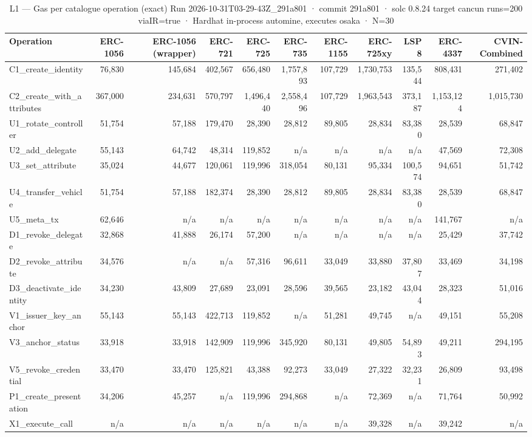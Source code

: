 \begin{table}[ht]
\centering
\small
\begin{tabular}{lrrrrrrrrrr}
\toprule
Operation & ERC-1056 & ERC-1056 (wrapper) & ERC-721 & ERC-725 & ERC-735 & ERC-1155 & ERC-725xy & LSP8 & ERC-4337 & CVIN-Combined \\
\midrule
C1\_create\_identity & 76,830 & 145,684 & 402,567 & 656,480 & 1,757,893 & 107,729 & 1,730,753 & 135,544 & 808,431 & 271,402 \\
C2\_create\_with\_attributes & 367,000 & 234,631 & 570,797 & 1,496,440 & 2,558,496 & 107,729 & 1,963,543 & 373,187 & 1,153,124 & 1,015,730 \\
U1\_rotate\_controller & 51,754 & 57,188 & 179,470 & 28,390 & 28,812 & 89,805 & 28,834 & 83,380 & 28,539 & 68,847 \\
U2\_add\_delegate & 55,143 & 64,742 & 48,314 & 119,852 & n/a & n/a & n/a & n/a & 47,569 & 72,308 \\
U3\_set\_attribute & 35,024 & 44,677 & 120,061 & 119,996 & 318,054 & 80,131 & 95,334 & 100,574 & 94,651 & 51,742 \\
U4\_transfer\_vehicle & 51,754 & 57,188 & 182,374 & 28,390 & 28,812 & 89,805 & 28,834 & 83,380 & 28,539 & 68,847 \\
U5\_meta\_tx & 62,646 & n/a & n/a & n/a & n/a & n/a & n/a & n/a & 141,767 & n/a \\
D1\_revoke\_delegate & 32,868 & 41,888 & 26,174 & 57,200 & n/a & n/a & n/a & n/a & 25,429 & 37,742 \\
D2\_revoke\_attribute & 34,576 & n/a & n/a & 57,316 & 96,611 & 33,049 & 33,880 & 37,807 & 33,469 & 34,198 \\
D3\_deactivate\_identity & 34,230 & 43,809 & 27,689 & 23,091 & 28,596 & 39,565 & 23,182 & 43,044 & 28,323 & 51,016 \\
V1\_issuer\_key\_anchor & 55,143 & 55,143 & 422,713 & 119,852 & n/a & 51,281 & 49,745 & n/a & 49,151 & 55,208 \\
V3\_anchor\_status & 33,918 & 33,918 & 142,909 & 119,996 & 345,920 & 80,131 & 49,805 & 54,893 & 49,211 & 294,195 \\
V5\_revoke\_credential & 33,470 & 33,470 & 125,821 & 43,388 & 92,273 & 33,049 & 27,322 & 32,231 & 26,809 & 93,498 \\
P1\_create\_presentation & 34,206 & 45,257 & n/a & 119,996 & 294,868 & n/a & 72,369 & n/a & 71,764 & 50,992 \\
X1\_execute\_call & n/a & n/a & n/a & n/a & n/a & n/a & 39,328 & n/a & 39,242 & n/a \\
\bottomrule
\end{tabular}
\caption{L1 — Gas per catalogue operation (exact) Run 2026-10-31T03-29-43Z\_291a801 · commit 291a801 · solc 0.8.24 target cancun runs=200 viaIR=true · Hardhat in-process automine, executes osaka · N=30}
\label{tab:crud_gas}
\end{table}
